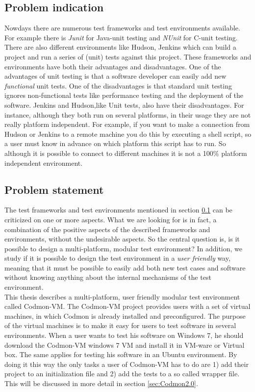 \documentclass[a4paper,10pt]{scrartcl}
\newcommand{\project}{Codmon-VM}
\newcommand{\CS}{C\nolinebreak\hspace{-.05em}\raisebox{.6ex}{\bf \#}}
\begin{document}
\subsection{Problem indication}
\label{subsec:Problemindication}
Nowdays there are numerous test frameworks and test environments available. For example there is \emph{Junit}\cite{Junit} for Java-unit testing and \emph{NUnit}\cite{Nunit} for \CS{}-unit testing.
There are also different environments like Hudson\cite{HudsonDoc}\cite{Hudson}, Jenkins\cite{JenkinsDoc} which can build a project and run a series of (unit) tests against this project. 
These frameworks and environments have both their advantages and disadvantages. One of the advantages of unit testing is that a software developer can easily add new \emph{functional} unit tests.
One of the disadvantages is that standard unit testing ignores non-functional tests like performance testing and the deployment of the software. Jenkins and Hudson,like Unit tests, also have their
disadvantages. For instance, although they both run on several platforms, in their usage they are not really platform independent. For example, if you want
to make a connection from Hudson or Jenkins to a remote machine you do this by executing a shell script, so a user must know in advance on which platform this script has to run.
So although it is possible to connect to different machines it is not a 100\% platform independent environment.
 
\subsection{Problem statement}
\label{subsec:Problemstatement}
The test frameworks and test environments mentioned in section \ref{subsec:Problemindication} can be criticized on one or more aspects. What we are looking for is in fact, a combination
of the positive aspects of the described frameworks and environments, without the undesirable aspects. So the central question is, is it possible to design a
multi-platform, modular test environment? In addition, we study if it is possible to design the test environment in a \emph{user friendly} way, meaning that it must
be possible to easily add both new test cases and software without knowing anything about the internal mechanisms of the test environment.\\

\noindent This thesis describes a multi-platform, user friendly modular test environment called \project{}. The \project{} project provides users with a set of virtual machines,
in which Codmon is already installed and preconfigured. The purpose of the virtual machines is to make it easy for users to test software in several environments.  When a user wants to 
test his software on Windows 7, he should download the \project{} windows 7 VM and install it in VM-ware or Virtual box. The same applies for testing his software in an Ubuntu environment. 
By doing it this way the  only tasks a user of \project{} has to do are 1) add their project to an initialization file and 2) add the tests to a so called wrapper file. This will be discussed 
in more detail in section \ref{sec:Codmon2.0}.
\end{document}
